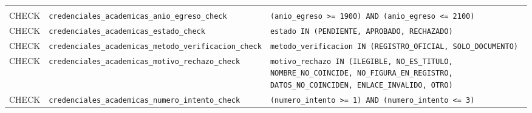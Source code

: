 {\small
\begin{xltabular}{\textwidth}{@{}>{\raggedright\arraybackslash}p{1.7cm} >{\raggedright\arraybackslash}p{4.6cm} L@{}}
    \toprule
     &  &  \\
    \midrule
    \endfirsthead
    \toprule
     &  &  \\
    \midrule
    \endhead
    \bottomrule
    \endfoot
    CHECK & \texttt{credenciales\_\allowbreak{}academicas\_\allowbreak{}anio\_\allowbreak{}egreso\_\allowbreak{}check} & \texttt{(\allowbreak{}anio\_\allowbreak{}egreso \textgreater{}= 1900) AND (\allowbreak{}anio\_\allowbreak{}egreso \textless{}= 2100)} \\
    CHECK & \texttt{credenciales\_\allowbreak{}academicas\_\allowbreak{}estado\_\allowbreak{}check} & \texttt{estado IN (\allowbreak{}\textquotesingle{}PENDIENTE\textquotesingle{},\allowbreak{} \textquotesingle{}APROBADO\textquotesingle{},\allowbreak{} \textquotesingle{}RECHAZADO\textquotesingle{})} \\
    CHECK & \texttt{credenciales\_\allowbreak{}academicas\_\allowbreak{}metodo\_\allowbreak{}verificacion\_\allowbreak{}check} & \texttt{metodo\_\allowbreak{}verificacion IN (\allowbreak{}\textquotesingle{}REGISTRO\_\allowbreak{}OFICIAL\textquotesingle{},\allowbreak{} \textquotesingle{}SOLO\_\allowbreak{}DOCUMENTO\textquotesingle{})} \\
    CHECK & \texttt{credenciales\_\allowbreak{}academicas\_\allowbreak{}motivo\_\allowbreak{}rechazo\_\allowbreak{}check} & \texttt{motivo\_\allowbreak{}rechazo IN (\allowbreak{}\textquotesingle{}ILEGIBLE\textquotesingle{},\allowbreak{} \textquotesingle{}NO\_\allowbreak{}ES\_\allowbreak{}TITULO\textquotesingle{},\allowbreak{} \textquotesingle{}NOMBRE\_\allowbreak{}NO\_\allowbreak{}COINCIDE\textquotesingle{},\allowbreak{} \textquotesingle{}NO\_\allowbreak{}FIGURA\_\allowbreak{}EN\_\allowbreak{}REGISTRO\textquotesingle{},\allowbreak{} \textquotesingle{}DATOS\_\allowbreak{}NO\_\allowbreak{}COINCIDEN\textquotesingle{},\allowbreak{} \textquotesingle{}ENLACE\_\allowbreak{}INVALIDO\textquotesingle{},\allowbreak{} \textquotesingle{}OTRO\textquotesingle{})} \\
    CHECK & \texttt{credenciales\_\allowbreak{}academicas\_\allowbreak{}numero\_\allowbreak{}intento\_\allowbreak{}check} & \texttt{(\allowbreak{}numero\_\allowbreak{}intento \textgreater{}= 1) AND (\allowbreak{}numero\_\allowbreak{}intento \textless{}= 3)} \\

\end{xltabular}}
